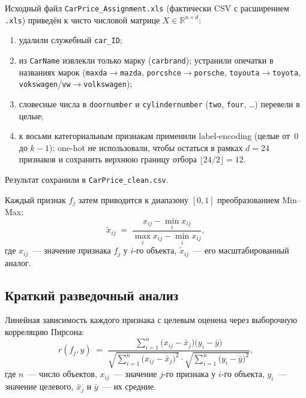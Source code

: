 \documentclass[12pt,a4paper]{article}
\begin{document}
Исходный файл \texttt{CarPrice\_Assignment.xls} (фактически CSV
с расширением \texttt{.xls}) приведён к чисто числовой матрице
$X \in \mathbb{R}^{n \times d}$:
\begin{enumerate}\setlength\itemsep{0pt}
  \item удалили служебный \texttt{car\_ID};
  \item из \texttt{CarName} извлекли только марку
        (\texttt{carbrand}); устранили опечатки в названиях марок
        (\texttt{maxda}$\to$\texttt{mazda},
         \texttt{porcshce}$\to$\texttt{porsche},
         \texttt{toyouta}$\to$\texttt{toyota},
         \texttt{vokswagen}/\texttt{vw}$\to$\texttt{volkswagen});
  \item словесные числа в \texttt{doornumber} и
        \texttt{cylindernumber} (\texttt{two}, \texttt{four}, \ldots)
        перевели в целые;
  \item к восьми категориальным признакам применили label-encoding
        (целые от~0 до $k-1$); one-hot не использовали, чтобы остаться
        в рамках $d=24$ признаков и сохранить верхнюю границу отбора
        $\lfloor 24/2 \rfloor = 12$.
\end{enumerate}
Результат сохранили в \texttt{CarPrice\_clean.csv}.

Каждый признак $f_j$ затем приводится к диапазону $[0,1]$ преобразованием
Min--Max:
\begin{equation}
  \tilde{x}_{ij} \;=\; \frac{x_{ij} - \min_i x_{ij}}{\max_i x_{ij} - \min_i x_{ij}},
  \label{eq:minmax}
\end{equation}
где $x_{ij}$~--- значение признака $f_j$ у $i$-го объекта,
$\tilde{x}_{ij}$~--- его масштабированный аналог.

\subsection{Краткий разведочный анализ}

Линейная зависимость каждого признака с целевым оценена через выборочную
корреляцию Пирсона:
\begin{equation}
  r(f_j, y) \;=\; \frac{\sum_{i=1}^{n}\bigl(x_{ij} - \bar{x}_j\bigr)\bigl(y_i - \bar{y}\bigr)}
                       {\sqrt{\sum_{i=1}^{n}\bigl(x_{ij}-\bar{x}_j\bigr)^2}
                        \cdot \sqrt{\sum_{i=1}^{n}\bigl(y_i-\bar{y}\bigr)^2}},
  \label{eq:pearson}
\end{equation}
где $n$~--- число объектов, $x_{ij}$~--- значение $j$-го признака
у $i$-го объекта, $y_i$~--- значение целевого, $\bar{x}_j$ и
$\bar{y}$~--- их средние.
\end{document}
